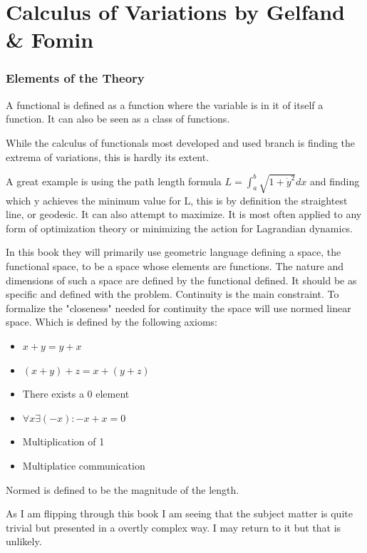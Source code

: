\chapter{Calculus of Variations by Gelfand \& Fomin}

\subsection{Elements of the Theory}
A functional is defined as a function where the variable is in it of itself a function. It can also be seen as a class of functions.

While the calculus of functionals most developed and used branch is finding the extrema of variations, this is hardly its extent.

A great example is using the path length formula $L = \int_a^b \sqrt{1+\dot{y}^2}dx$ and finding which y achieves the minimum value for L, this is by definition the straightest line, or geodesic. It can also attempt to maximize. It is most often applied to any form of optimization theory or minimizing the action for Lagrandian dynamics.

In this book they will primarily use geometric language defining a space, the functional space, to be a space whose elements are functions. The nature and dimensions of such a space are defined by the functional defined. It should be as specific and defined with the problem. Continuity is the main constraint. To formalize the "closeness" needed for continuity the space will use normed linear space. Which is defined by the following axioms:

\begin{itemize}
  \item $x+y = y+x$
  \item $(x+y)+z=x+(y+z)$
  \item There exists a 0 element
  \item $\forall x \exists (-x): -x+x=0$
  \item Multiplication of 1
  \item Multiplatice communication
\end{itemize}
Normed is defined to be the magnitude of the length.

As I am flipping through this book I am seeing that the subject matter is quite trivial but presented in a overtly complex way. I may return to it but that is unlikely.
